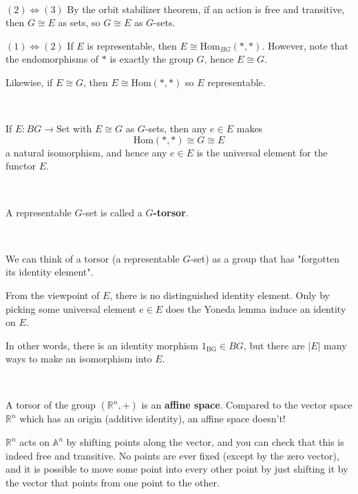 \documentclass{article}
\begin{document}
\begin{customproof}
\

$(2) \iff (3)$ By the orbit stabilizer theorem, if an action is free and transitive, then $G \cong E$ as sets, so $G \cong E$ as $G$-sets. 

$(1) \iff (2)$ If $E$ is representable, then $E \cong \text{Hom}_{BG}(*,*)$. However, note that the endomorphisms of $*$ is exactly the group $G$, hence $E \cong G$. 

Likewise, if $E \cong G$, then $E \cong \text{Hom}(*,*)$ so $E$ representable.
\end{customproof}

\begin{proposition}
\

If $E: BG \to \text{Set}$ with $E \cong G$ as $G$-sets, then any $e \in E$ makes $$\text{Hom}(*,*) \cong G \cong E$$a natural isomorphism, and hence any $e \in E$ is the universal element for the functor $E$.
\end{proposition}

\begin{definition}[Torsor]
\

A representable $G$-set is called a \textbf{$G$-torsor}. 
\end{definition}

\begin{remark}
\

We can think of a torsor (a representable $G$-set) as a group that has "forgotten its identity element".

From the viewpoint of $E$, there is no distinguished identity element. Only by picking some universal element $e \in E$ does the Yoneda lemma induce an identity on $E$. 

In other words, there is an identity morphism $1_\text{BG} \in BG$, but there are $\vert E \vert$ many ways to make an isomorphism into $E$. 
\end{remark}

\begin{example}
\

A torsor of the group $(\mathbb{R}^n, +)$ is an \textbf{affine space}. Compared to the vector space $\mathbb{R}^n$ which has an origin (additive identity), an affine space doesn't!

$\mathbb{R}^n$ acts on $\mathbb{A}^n$ by shifting points along the vector, and you can check that this is indeed free and transitive. No points are ever fixed (except by the zero vector), and it is possible to move some point into every other point by just shifting it by the vector that points from one point to the other. 
\end{example}
\end{document}
